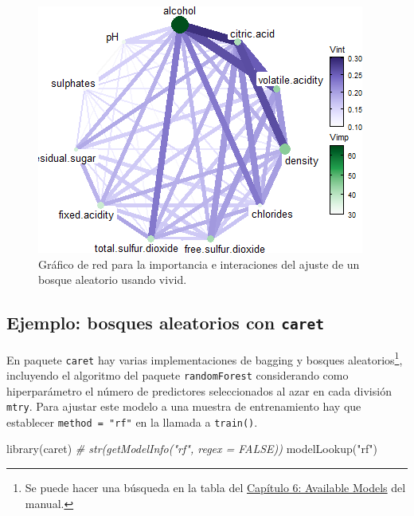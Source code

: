 \documentclass[
  spanish,
]{book}
\newenvironment{Shaded}{\begin{snugshade}}{\end{snugshade}}
\newcommand{\CommentTok}[1]{\textcolor[rgb]{0.56,0.35,0.01}{\textit{#1}}}
\newcommand{\FunctionTok}[1]{\textcolor[rgb]{0.00,0.00,0.00}{#1}}
\newcommand{\NormalTok}[1]{#1}
\newcommand{\StringTok}[1]{\textcolor[rgb]{0.31,0.60,0.02}{#1}}
\theoremstyle{break}
\theoremstyle{definition}
\theoremstyle{definition}
\theoremstyle{definition}
\theoremstyle{definition}
\theoremstyle{remark}
\begin{document}
\begin{figure}[!htb]

{\centering \includegraphics[width=0.8\linewidth]{images/rf-vivid2-1} 

}

\caption{Gráfico de red para la importancia e interaciones del ajuste de un bosque aleatorio usando vivid.}\label{fig:rf-vivid2-plot}
\end{figure}

\hypertarget{ejemplo-bosques-aleatorios-con-caret}{%
\subsection{\texorpdfstring{Ejemplo: bosques aleatorios con \texttt{caret}}{Ejemplo: bosques aleatorios con caret}}\label{ejemplo-bosques-aleatorios-con-caret}}

En paquete \texttt{caret} hay varias implementaciones de bagging y bosques aleatorios\footnote{Se puede hacer una búsqueda en la tabla del \href{https://topepo.github.io/caret/available-models.html}{Capítulo 6: Available Models} del manual.}, incluyendo el algoritmo del paquete \texttt{randomForest} considerando como hiperparámetro el número de predictores seleccionados al azar en cada división \texttt{mtry}.
Para ajustar este modelo a una muestra de entrenamiento hay que establecer \texttt{method\ =\ "rf"} en la llamada a \texttt{train()}.

\begin{Shaded}
\begin{Highlighting}[]
\FunctionTok{library}\NormalTok{(caret)}
\CommentTok{\# str(getModelInfo("rf", regex = FALSE))}
\FunctionTok{modelLookup}\NormalTok{(}\StringTok{"rf"}\NormalTok{)}
\end{Highlighting}
\end{Shaded}
\end{document}
